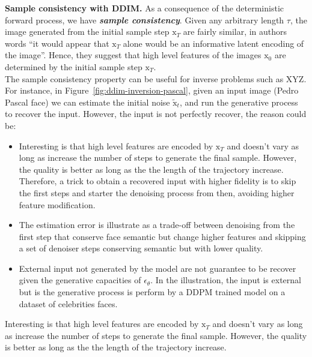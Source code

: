 \noindent \textbf{Sample consistency with DDIM.}  As a consequence of the deterministic forward process, we have \textit{\textbf{sample consistency}}. Given any arbitrary length $\tau$, the image generated from the initial sample step $\mathrm{x}_{T}$ are fairly similar, in authors words ``it would appear that $\mathrm{x}_{T}$ alone would be an informative latent encoding of the image''.  Hence, they suggest that high level features of the images $\mathrm{x}_{0}$ are determined by the initial sample step $\mathrm{x}_{T}$. \\

\noindent The sample consistency property can be useful for inverse problems such as XYZ. For instance, in Figure~\ref{fig:ddim-inversion-pascal}, given an input image (Pedro Pascal face) we can estimate the initial noise $\tilde{\mathrm{x}}_{t}$, and run the generative process to recover the input. However, the input is not perfectly recover, the reason could be:

\begin{itemize}
    \item Interesting is that high level features are encoded by $\mathrm{x}_{T}$ and doesn't vary as long as increase the number of steps to generate the final sample. However, the quality is better as long as the the length of the trajectory increase. Therefore, a trick to obtain a recovered input with higher fidelity is to skip the first steps and starter the denoising process from then, avoiding higher feature modification.
    \item The estimation error is illustrate as a trade-off between denoising from the first step that conserve face semantic but change higher features and skipping a set of denoiser steps conserving semantic but with lower quality.
    \item External input not generated by the model are not guarantee to be recover given the generative capacities of $\epsilon_{\theta}$. In the illustration, the input is external but is the generative process is perform by a DDPM trained model on a dataset of celebrities faces.
\end{itemize}

\noindent Interesting is that high level features are encoded by $\mathrm{x}_{T}$ and doesn't vary as long as increase the number of steps to generate the final sample. However, the quality is better as long as the the length of the trajectory increase. \\

